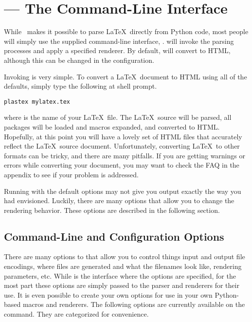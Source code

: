 
\chapter{\protect{} --- The Command-Line Interface}
\label{sec:command-line}

While \plasTeX\ makes it possible to parse \LaTeX\ directly from Python
code, most people will simply use the supplied command-line interface, 
.   will invoke the parsing processes
and apply a specified renderer.  By default,  will
convert to HTML, although this can be changed in the 
configuration.  

Invoking  is very simple.  To convert a \LaTeX\ document 
to HTML using all of the defaults, simply type the following at shell prompt.

\begin{verbatim}
plastex mylatex.tex
\end{verbatim}

where  is the name of your \LaTeX\ file.  The 
\LaTeX\ source will be parsed, all packages will be loaded and macros 
expanded, and converted to HTML.  Hopefully, at this point you will have
a lovely set of HTML files that accurately reflect the \LaTeX\ source 
document.  Unfortunately, converting \LaTeX\ to other formats can be 
tricky, and there are many pitfalls.  If you are getting warnings or
errors while converting your document, you may want to check the FAQ
in the appendix to see if your problem is addressed.

Running  with the default options may not give you output
exactly the way you had envisioned.  Luckily, there are many options
that allow you to change the rendering behavior.  These options are 
described in the following section.


\section{Command-Line and Configuration Options}

There are many options to  that allow you to control
things input and output file encodings, where files are generated and
what the filenames look like, rendering parameters, etc.  While 
 is the interface where the options are specified, for
the most part these options are simply passed to the parser and renderers
for their use.  It is even possible to create your own options for use
in your own Python-based macros and renderers.
The following options are currently available
on the  command.  They are categorized for convenience. 


